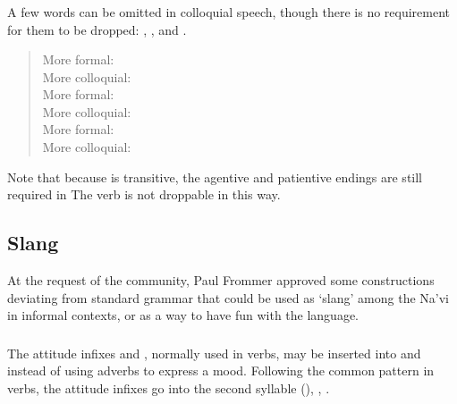 \subsubsection{} \label{prag:colloq:omit}
A few words can be omitted in colloquial speech, though there is no
requirement for them to be dropped: , , and .

\begin{quotation}
\noindent More formal:  \\
\noindent More colloquial:   \\

\noindent More formal:  \\
\noindent More colloquial:  \\

\noindent More formal:  \\
\noindent More colloquial:  
\end{quotation}

\noindent Note that because  is transitive, the agentive and
patientive endings are still required in 
The verb   is not droppable in this way.

\subsection{Slang} At the request of the community, Paul Frommer approved
some constructions deviating from standard grammar that could be used
as `slang' among the Na'vi in informal contexts, or as a way to have
fun with the language.

\subsubsection{}The attitude infixes  and ,
normally used in verbs, may be inserted into  
and   instead of using adverbs to express a mood.
Following the common pattern in verbs, the attitude infixes go into
the second syllable (),
, . 

